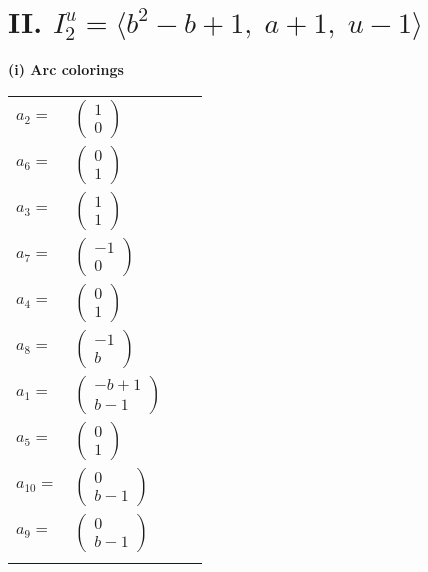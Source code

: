 \documentclass[1p]{elsarticle_modified}
\theoremstyle{definition}
\begin{document}
\centering \section*{II. $I^u_{2}= \langle b^2- b+1,\;a+1,\;u-1 \rangle$}
\flushleft \textbf{(i) Arc colorings}\\
\begin{tabular}{m{7pt} m{180pt} m{7pt} m{180pt} }
\flushright $a_{2}=$&$\begin{pmatrix}1\\0\end{pmatrix}$ \\
\flushright $a_{6}=$&$\begin{pmatrix}0\\1\end{pmatrix}$ \\
\flushright $a_{3}=$&$\begin{pmatrix}1\\1\end{pmatrix}$ \\
\flushright $a_{7}=$&$\begin{pmatrix}-1\\0\end{pmatrix}$ \\
\flushright $a_{4}=$&$\begin{pmatrix}0\\1\end{pmatrix}$ \\
\flushright $a_{8}=$&$\begin{pmatrix}-1\\b\end{pmatrix}$ \\
\flushright $a_{1}=$&$\begin{pmatrix}- b+1\\b-1\end{pmatrix}$ \\
\flushright $a_{5}=$&$\begin{pmatrix}0\\1\end{pmatrix}$ \\
\flushright $a_{10}=$&$\begin{pmatrix}0\\b-1\end{pmatrix}$ \\
\flushright $a_{9}=$&$\begin{pmatrix}0\\b-1\end{pmatrix}$\\&\end{tabular}
\end{document}
